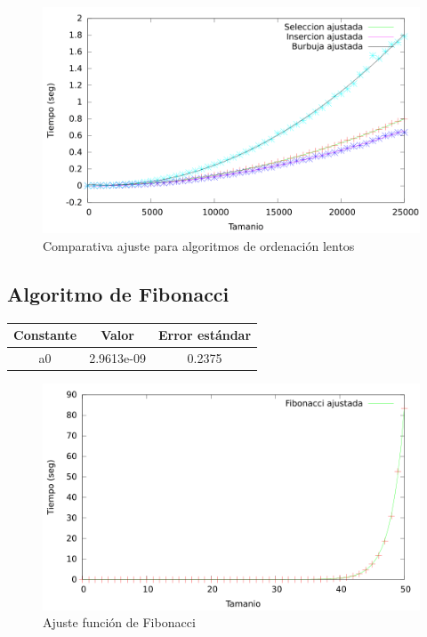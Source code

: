 \documentclass{article}
\begin{document}
	\begin{figure}[H]
		\centering
		\includegraphics[totalheight=8cm]{img/AlgOrdenacionLentos_ajustados}
		\caption{Comparativa ajuste para algoritmos de ordenación lentos}
		\label{fig:AlgOrdenacionLentos_ajustados}
	\end{figure}
	
	
	\subsection{Algoritmo de Fibonacci}
	
	
	\begin{longtable}{|c|c|c|}
		\hline
		Constante		& Valor			& Error estándar	\\ \hline
		a0              & 2.9613e-09	& 0.2375 \\ \hline
	\end{longtable}

	\begin{figure}[H]
		\centering
		\includegraphics[totalheight=8cm]{img/Fibonacci_ajustada}
		\caption{Ajuste función de Fibonacci}
		\label{fig:Fibonacci_ajustada}
	\end{figure}
	
\end{document}
